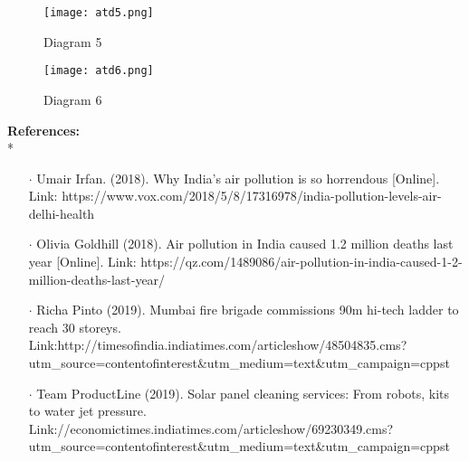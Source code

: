 \documentclass[12pt]{article}
\begin{document}
\begin{figure}
	\centering
\texttt{[image: atd5.png]}
\caption{ Diagram 5} 
\texttt{[image: atd6.png]}
\caption{ Diagram 6} 
\label{image_5} %
\label{image_6} %
\end{figure}



\textbf{References:}\\*
\begin{itemize}
	\item[$\cdot$] Umair Irfan. (2018). Why India’s air pollution is so horrendous [Online].
	Link: https://www.vox.com/2018/5/8/17316978/india-pollution-levels-air-delhi-health
	\item[$\cdot$] Olivia Goldhill (2018). Air pollution in India caused 1.2 million deaths last year [Online].
	Link: https://qz.com/1489086/air-pollution-in-india-caused-1-2-million-deaths-last-year/
	\item[$\cdot$] Richa Pinto (2019). Mumbai fire brigade commissions 90m hi-tech ladder to reach 30 storeys.
	Link:http://timesofindia.indiatimes.com/articleshow/48504835.cms?utm\_source=contentofinterest\&utm\_medium=text\&utm\_campaign=cppst
	\item[$\cdot$] Team ProductLine (2019). Solar panel cleaning services: From robots, kits to water jet pressure.
	Link://economictimes.indiatimes.com/articleshow/69230349.cms?utm\_source=contentofinterest\&utm\_medium=text\&utm\_campaign=cppst
\end{itemize}
\end{document}
